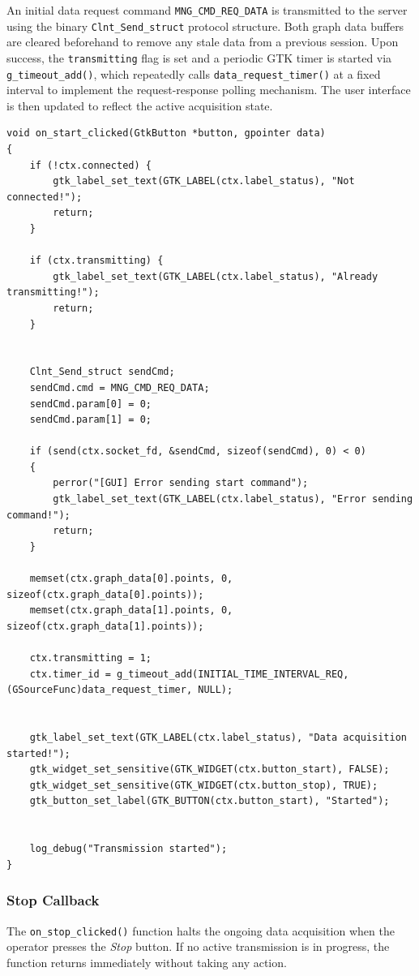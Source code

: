 An initial data request command \texttt{MNG\_CMD\_REQ\_DATA} is
transmitted to the server using the binary \texttt{Clnt\_Send\_struct}
protocol structure. Both graph data buffers are cleared beforehand to
remove any stale data from a previous session. Upon success, the
\texttt{transmitting} flag is set and a periodic GTK timer is started via
\texttt{g\_timeout\_add()}, which repeatedly calls
\texttt{data\_request\_timer()} at a fixed interval to implement the
request-response polling mechanism. The user interface is then updated
to reflect the active acquisition state.


\begin{verbatim}
void on_start_clicked(GtkButton *button, gpointer data)
{
    if (!ctx.connected) {
        gtk_label_set_text(GTK_LABEL(ctx.label_status), "Not connected!");
        return;
    }

    if (ctx.transmitting) {
        gtk_label_set_text(GTK_LABEL(ctx.label_status), "Already transmitting!");
        return;
    }


	Clnt_Send_struct sendCmd;
    sendCmd.cmd = MNG_CMD_REQ_DATA;
    sendCmd.param[0] = 0;
    sendCmd.param[1] = 0;

    if (send(ctx.socket_fd, &sendCmd, sizeof(sendCmd), 0) < 0)
    {
        perror("[GUI] Error sending start command");
        gtk_label_set_text(GTK_LABEL(ctx.label_status), "Error sending command!");
        return;
    }

    memset(ctx.graph_data[0].points, 0, sizeof(ctx.graph_data[0].points));
    memset(ctx.graph_data[1].points, 0, sizeof(ctx.graph_data[1].points));

    ctx.transmitting = 1;
    ctx.timer_id = g_timeout_add(INITIAL_TIME_INTERVAL_REQ, (GSourceFunc)data_request_timer, NULL);


    gtk_label_set_text(GTK_LABEL(ctx.label_status), "Data acquisition started!");
    gtk_widget_set_sensitive(GTK_WIDGET(ctx.button_start), FALSE);
    gtk_widget_set_sensitive(GTK_WIDGET(ctx.button_stop), TRUE);
    gtk_button_set_label(GTK_BUTTON(ctx.button_start), "Started");


    log_debug("Transmission started");
}
\end{verbatim}

\subsubsection{Stop Callback}

The \texttt{on\_stop\_clicked()} function halts the ongoing data
acquisition when the operator presses the \textit{Stop} button. If no
active transmission is in progress, the function returns immediately
without taking any action.

